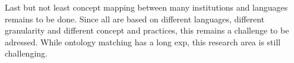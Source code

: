 \documentclass{amia}
\begin{document}
Last but not least concept mapping between many institutions and languages remains to be done. Since all are based on different languages, different granularity and different concept and practices, this remains a challenge to be adressed. While ontology matching has a long exp, this research area is still challenging.

%
%
%
%
\end{document}
